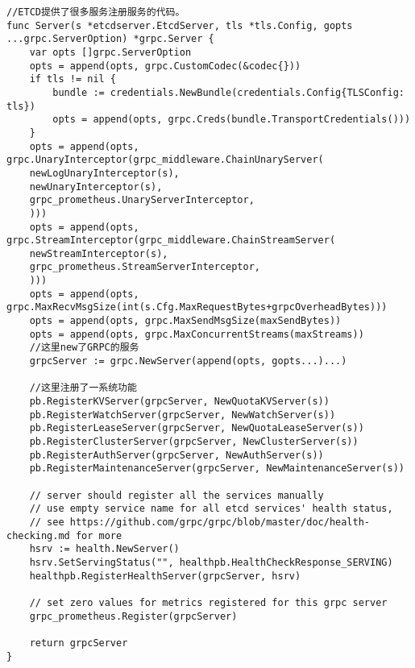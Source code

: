 \begin{verbatim}
//ETCD提供了很多服务注册服务的代码。
func Server(s *etcdserver.EtcdServer, tls *tls.Config, gopts ...grpc.ServerOption) *grpc.Server {
	var opts []grpc.ServerOption
	opts = append(opts, grpc.CustomCodec(&codec{}))
	if tls != nil {
		bundle := credentials.NewBundle(credentials.Config{TLSConfig: tls})
		opts = append(opts, grpc.Creds(bundle.TransportCredentials()))
	}
	opts = append(opts, grpc.UnaryInterceptor(grpc_middleware.ChainUnaryServer(
	newLogUnaryInterceptor(s),
	newUnaryInterceptor(s),
	grpc_prometheus.UnaryServerInterceptor,
	)))
	opts = append(opts, grpc.StreamInterceptor(grpc_middleware.ChainStreamServer(
	newStreamInterceptor(s),
	grpc_prometheus.StreamServerInterceptor,
	)))
	opts = append(opts, grpc.MaxRecvMsgSize(int(s.Cfg.MaxRequestBytes+grpcOverheadBytes)))
	opts = append(opts, grpc.MaxSendMsgSize(maxSendBytes))
	opts = append(opts, grpc.MaxConcurrentStreams(maxStreams))
	//这里new了GRPC的服务
	grpcServer := grpc.NewServer(append(opts, gopts...)...)
	
	//这里注册了一系统功能
	pb.RegisterKVServer(grpcServer, NewQuotaKVServer(s))
	pb.RegisterWatchServer(grpcServer, NewWatchServer(s))
	pb.RegisterLeaseServer(grpcServer, NewQuotaLeaseServer(s))
	pb.RegisterClusterServer(grpcServer, NewClusterServer(s))
	pb.RegisterAuthServer(grpcServer, NewAuthServer(s))
	pb.RegisterMaintenanceServer(grpcServer, NewMaintenanceServer(s))
	
	// server should register all the services manually
	// use empty service name for all etcd services' health status,
	// see https://github.com/grpc/grpc/blob/master/doc/health-checking.md for more
	hsrv := health.NewServer()
	hsrv.SetServingStatus("", healthpb.HealthCheckResponse_SERVING)
	healthpb.RegisterHealthServer(grpcServer, hsrv)
	
	// set zero values for metrics registered for this grpc server
	grpc_prometheus.Register(grpcServer)
	
	return grpcServer
}
\end{verbatim}